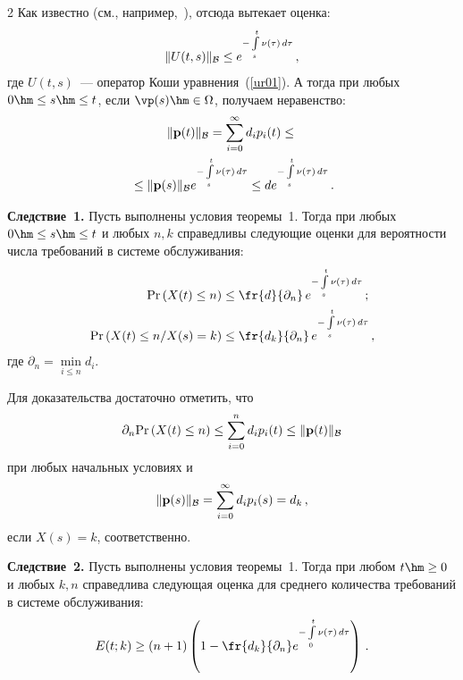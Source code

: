 \begin{multicols}{2}
Как известно (см., например,~\cite{z08b}), отсюда вытекает оценка:
\begin{equation*}
\|U(t,s)\|_{\cal B} \le e^{-\int\limits_s^t \nu(\tau) \, d\tau} \,,
\end{equation*}
где $U(t,s)$~--- оператор Коши уравнения~(\ref{ur01}).
А тогда при любых $0 \hm\le s \hm\le t$, если $\vp(s) \hm\in \Omega$, получаем неравенство:
\begin{multline*}
\|{\bf p} (t)\|_{\cal B} = \sum\limits_{i=0}^{\infty} d_i p_i (t) \le{}\\
{}\le
\|{\bf p} (s)\|_{\cal B} e^{-\int\limits_s^t \nu(\tau) \, d\tau} \le 
{d} e^{-\int\limits_s^t \nu(\tau) \, d\tau} \,.  
\end{multline*}

\bigskip

\noindent
\textbf{Следствие~1.}
Пусть выполнены условия теоремы~1. Тогда при любых $0 \hm\le s \hm\le t$ и любых $n, k$ 
справедливы следующие оценки для вероятности числа требований в системе обслуживания:
\begin{align}
\mathrm{Pr} \left(X(t) \le n \right) &\le 
\fr{d}{\partial_n }\,e^{-\int\limits_s^t \nu(\tau) \, d\tau}\,;
\notag\\
\mathrm{Pr} \left(X(t)  \le n / X(s) = k \right) &\le \fr{d_k}{\partial_n}\,
e^{-\int\limits_s^t \nu(\tau) \, d\tau}\,,
\label{2011}
\end{align}
где ${\partial}_n = \min\limits_{i \le n} d_i$.

\medskip

Для доказательства достаточно отметить, что
\begin{equation*}
{{\partial}_n} \mathrm{Pr} \left(X(t)  \le n \right)  \le  \sum\limits_{i=0}^{n} d_i p_i (t) \le
\|{\bf p} (t)\|_{\cal B}  
\end{equation*}
при любых начальных условиях и
\begin{equation*}
\|{\bf p} (s)\|_{\cal B} = \sum\limits_{i=0}^{\infty} d_i p_i (s) = d_k\,, 
\end{equation*}
если $X(s) = k$, соответственно.

\bigskip

\noindent
\textbf{Следствие~2.}
Пусть выполнены условия теоремы~1. Тогда при любом $t \hm\ge 0$ и любых $k,n$ 
справедлива следующая оценка для среднего количества требований в системе обслуживания:
\begin{equation*}
E(t;k) \ge \left(n+1\right) \left(1 - \fr{d_k}{{\partial}_n}
e^{-\int\limits_0^t \nu(\tau) \, d\tau}\right)\,.  
\end{equation*}



\end{multicols}
